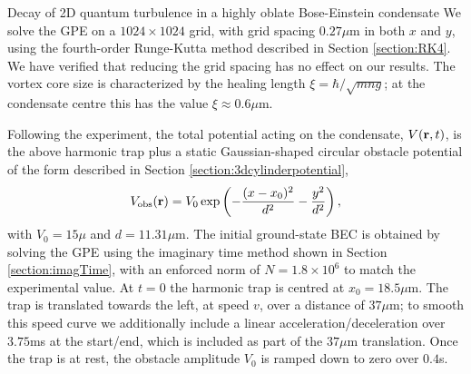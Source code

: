 \begin{chapter}{\label{cha:shin}Decay of 2D quantum turbulence in a highly oblate Bose-Einstein condensate}
We solve the GPE on a $1024 \times 1024$ grid, with grid spacing $0.27\mu$m in both $x$ and $y$, using the fourth-order Runge-Kutta method described in Section \ref{section:RK4}. We have verified that reducing the grid spacing has no effect on our results. The vortex core size is characterized by the healing length $\xi=\hbar/\sqrt{m n g}$; at the condensate centre this has the value $\xi \approx 0.6 \mu$m.

Following the experiment, the total potential acting on the condensate, $V({\bf r},t)$, is the above harmonic trap plus a static Gaussian-shaped circular obstacle potential of the form described in Section \ref{section:3dcylinderpotential},
\begin{equation}
  V_{\rm{obs}}({\bf r}) = V_0 \exp\left ( -\frac{(x-x_0)^2}{d^2}-\frac{y^2}{d^2}\right ),
\end{equation}
with $V_0=15 \mu$ and $d=11.31\mu$m.  The initial ground-state BEC is obtained by solving the GPE using the imaginary time method shown in Section \ref{section:imagTime}, with an enforced norm of $N=1.8\times 10^6$ to match the experimental value.  At $t=0$ the harmonic trap is centred at $x_0=18.5\mu$m. The trap is translated towards the left, at speed $v$, over a distance of $37 \mu$m; to smooth this speed curve we additionally include a linear acceleration/deceleration over $3.75$ms at the start/end, which is included as part of the $37\mu$m translation.  Once the trap is at rest, the obstacle amplitude $V_0$ is ramped down to zero over $0.4$s.


\end{chapter}
